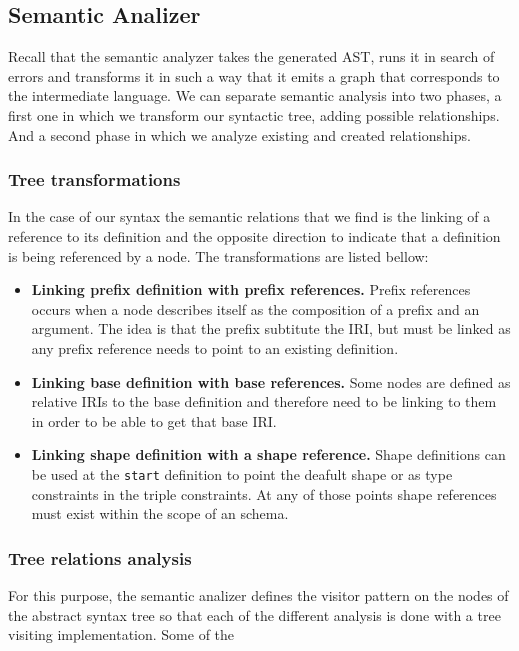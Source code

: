 \subsection{Semantic Analizer}
Recall that the semantic analyzer takes the generated AST, runs it in search of errors and transforms it in such a way that
it emits a graph that corresponds to the intermediate language. We can separate semantic analysis into two phases, a first
one in which we transform our syntactic tree, adding possible relationships. And a second phase in which we analyze existing
and created relationships.

\subsubsection{Tree transformations}
In the case of our syntax the semantic relations that we find is the linking of a reference to its definition and the opposite
direction to indicate that a definition is being referenced by a node. The transformations are listed bellow:

\begin{itemize}
    \item \textbf{Linking prefix definition with prefix references.} Prefix references occurs when a node describes itself as
    the composition of a prefix and an argument. The idea is that the prefix subtitute the IRI, but must be linked as any
    prefix reference needs to point to an existing definition.
    \item \textbf{Linking base definition with base references.} Some nodes are defined as relative IRIs to the base definition
    and therefore need to be linking to them in order to be able to get that base IRI.
    \item \textbf{Linking shape definition with a shape reference.} Shape definitions can be used at the \texttt{start} definition
    to point the deafult shape or as type constraints in the triple constraints. At any of those points shape references must
    exist within the scope of an schema.
\end{itemize}

\subsubsection{Tree relations analysis}
For this purpose, the semantic analizer defines the visitor pattern on the nodes of the abstract syntax tree so that each of the different
analysis is done with a tree visiting implementation. Some of the 

